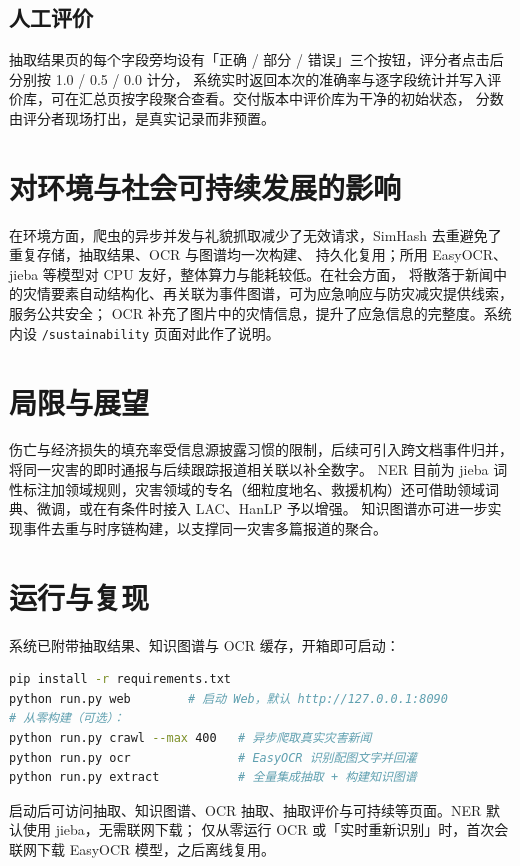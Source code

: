 \documentclass[11pt,a4paper]{ctexart}
\begin{document}
\subsection{人工评价}

抽取结果页的每个字段旁均设有「正确 / 部分 / 错误」三个按钮，评分者点击后分别按 1.0 / 0.5 / 0.0 计分，
系统实时返回本次的准确率与逐字段统计并写入评价库，可在汇总页按字段聚合查看。交付版本中评价库为干净的初始状态，
分数由评分者现场打出，是真实记录而非预置。

\section{对环境与社会可持续发展的影响}

在环境方面，爬虫的异步并发与礼貌抓取减少了无效请求，SimHash 去重避免了重复存储，抽取结果、OCR 与图谱均一次构建、
持久化复用；所用 EasyOCR、jieba 等模型对 CPU 友好，整体算力与能耗较低。在社会方面，
将散落于新闻中的灾情要素自动结构化、再关联为事件图谱，可为应急响应与防灾减灾提供线索，服务公共安全；
OCR 补充了图片中的灾情信息，提升了应急信息的完整度。系统内设 \texttt{/sustainability} 页面对此作了说明。

\section{局限与展望}

伤亡与经济损失的填充率受信息源披露习惯的限制，后续可引入跨文档事件归并，将同一灾害的即时通报与后续跟踪报道相关联以补全数字。
NER 目前为 jieba 词性标注加领域规则，灾害领域的专名（细粒度地名、救援机构）还可借助领域词典、微调，或在有条件时接入 LAC、HanLP 予以增强。
知识图谱亦可进一步实现事件去重与时序链构建，以支撑同一灾害多篇报道的聚合。

\section{运行与复现}

系统已附带抽取结果、知识图谱与 OCR 缓存，开箱即可启动：

\begin{lstlisting}[language=bash]
pip install -r requirements.txt
python run.py web        # 启动 Web，默认 http://127.0.0.1:8090
# 从零构建（可选）：
python run.py crawl --max 400   # 异步爬取真实灾害新闻
python run.py ocr               # EasyOCR 识别配图文字并回灌
python run.py extract           # 全量集成抽取 + 构建知识图谱
\end{lstlisting}

\noindent
启动后可访问抽取、知识图谱、OCR 抽取、抽取评价与可持续等页面。NER 默认使用 jieba，无需联网下载；
仅从零运行 OCR 或「实时重新识别」时，首次会联网下载 EasyOCR 模型，之后离线复用。
\end{document}
